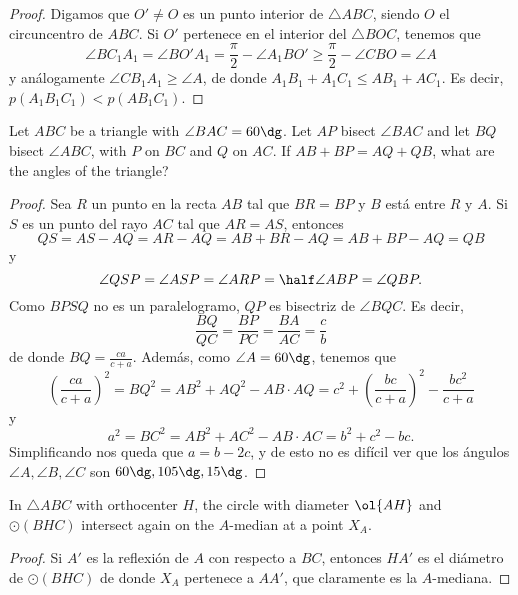 \begin{proof}
	Digamos que $O'\ne O$ es un punto interior de $\triangle ABC$, siendo $O$ el circuncentro de $ABC$. Si $O'$ pertenece en el interior del $\triangle BOC$, tenemos que
	\[\angle BC_1A_1=\angle BO'A_1=\frac{\pi}{2}-\angle A_1BO'\ge\frac{\pi}{2}-\angle CBO=\angle A\]
	y análogamente $\angle CB_1A_1\ge\angle A$, de donde $A_1B_1+A_1C_1\le AB_1+AC_1$. Es decir, $p(A_1B_1C_1)<p(AB_1C_1)$.
\end{proof}

\begin{probEG}[ISL 2001/G8]
	Let $ABC$ be a triangle with $\angle BAC=60\dg$. Let $AP$ bisect $\angle BAC$ and let $BQ$ bisect $\angle ABC$, with $P$ on $BC$ and $Q$ on $AC$. If $AB+BP=AQ+QB$, what are the angles of the triangle?
\end{probEG}

\begin{proof}
	Sea $R$ un punto en la recta $AB$ tal que $BR=BP$ y $B$ está entre $R$ y $A$. Si $S$ es un punto del rayo $AC$ tal que $AR=AS$, entonces
	\[QS=AS-AQ=AR-AQ=AB+BR-AQ=AB+BP-AQ=QB\]
	y
	\[\angle QSP=\angle ASP=\angle ARP=\half\angle ABP=\angle QBP.\]
	Como $BPSQ$ no es un paralelogramo, $QP$ es bisectriz de $\angle BQC$. Es decir,
	\[\frac{BQ}{QC}=\frac{BP}{PC}=\frac{BA}{AC}=\frac{c}{b}\]
	de donde $BQ=\frac{ca}{c+a}$. Además, como $\angle A=60\dg$, tenemos que
	\[\left(\frac{ca}{c+a}\right)^2=BQ^2=AB^2+AQ^2-AB\cdot AQ=c^2+\left(\frac{bc}{c+a}\right)^2-\frac{bc^2}{c+a}\]
	y
	\[a^2=BC^2=AB^2+AC^2-AB\cdot AC=b^2+c^2-bc.\]
	Simplificando nos queda que $a=b-2c$, y de esto no es difícil ver que los ángulos $\angle A,\angle B,\angle C$ son $60\dg,105\dg,15\dg$.
\end{proof}


\begin{probEG}
	In $\triangle ABC$ with orthocenter $H$, the circle with diameter $\ol{AH}$ and $\odot(BHC)$ intersect again on the $A$-median at a point $X_A$.
\end{probEG}

\begin{proof}
	Si $A'$ es la reflexión de $A$ con respecto a $BC$, entonces $HA'$ es el diámetro de $\odot(BHC)$ de donde $X_A$ pertenece a $AA'$, que claramente es la $A$-mediana.
\end{proof}

